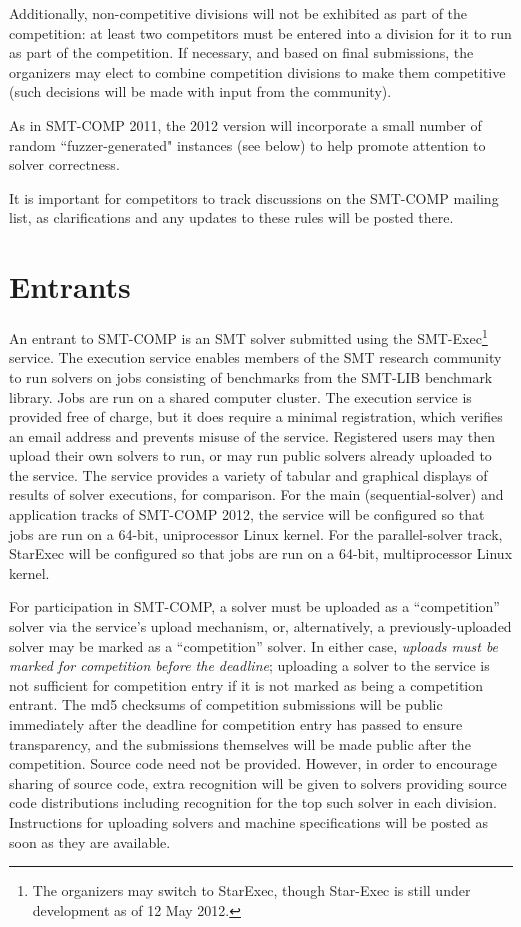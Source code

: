 \documentclass[12pt]{article}
\begin{document}
Additionally, non-competitive divisions will not be exhibited as
part of the competition: at least two competitors must be entered
into a division for it to run as part of the competition.
If necessary, and based on final submissions, the organizers may elect to
combine competition divisions to make them competitive (such decisions will
be made with input from the community).

As in SMT-COMP 2011, the 2012 version will incorporate a small number of
random ``fuzzer-generated" instances (see below) to help promote
attention to solver correctness.

It is important for competitors to track discussions on the SMT-COMP mailing
list, as clarifications and any updates to these rules will be posted there.

\section{Entrants}
\label{sec:entrants}

An entrant to SMT-COMP is an SMT solver
submitted using the SMT-Exec\footnote{The organizers may switch to StarExec, 
though Star-Exec is still under development as of 12 May 2012.} service.  
The execution service enables members of the
SMT research community to run solvers on jobs consisting of benchmarks
from the SMT-LIB benchmark library.  Jobs are run on a shared computer
cluster.  The execution service is provided free of
charge, but it does require a minimal registration, which verifies an
email address and prevents misuse of the service.  Registered users
may then upload their own solvers to run, or may run public solvers
already uploaded to the service.  The service provides a variety of tabular
and graphical displays of results of solver executions, for
comparison. For the main (sequential-solver)
and application tracks 
of SMT-COMP 2012, the service will be configured so that jobs are run on a 64-bit,
uniprocessor Linux kernel.  For the parallel-solver track, StarExec
will be configured so that jobs are run on a 64-bit, multiprocessor
Linux kernel.

For participation in SMT-COMP, a solver must be
uploaded as a ``competition'' solver via the service's upload
mechanism, or, alternatively, a previously-uploaded solver may be
marked as a ``competition'' solver.  In either case, \emph{uploads
must be marked for competition before the deadline}; uploading a solver
to the service is not sufficient for competition entry if it is not marked
as being a competition entrant.  The md5 checksums of competition
submissions will be public immediately after the deadline for competition
entry has passed to ensure transparency, and the submissions themselves
will be made public after the competition.  Source code need not be
provided.  However, in order to encourage sharing of source code, extra
recognition will be given to solvers providing source code distributions
including recognition for the top such solver in each division.  Instructions
for uploading solvers and machine specifications will be posted as soon
as they are available.
\end{document}
